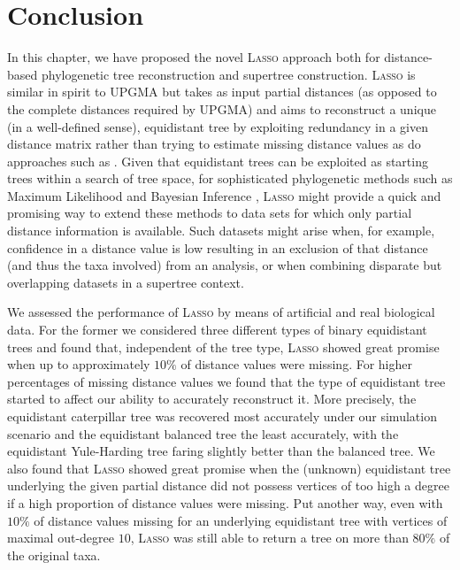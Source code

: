 \section{Conclusion}
\label{sec:conclusion}

In this chapter, we have proposed the novel \textsc{Lasso} approach both for
distance-based phylogenetic tree reconstruction and supertree construction.
\textsc{Lasso} is similar in spirit to \textsc{UPGMA} but takes as input
partial distances (as opposed to the complete distances required by
\textsc{UPGMA}) and aims to reconstruct a unique (in a well-defined sense),
equidistant tree by exploiting redundancy in a given distance matrix rather
than trying to estimate missing distance values as do approaches such as
\cite{criscuolo2008fastnj}. Given that equidistant trees can be exploited as
starting trees within a search of tree space, for sophisticated phylogenetic
methods such as Maximum Likelihood and Bayesian Inference
\cite{burbrink09molecular,bouckaert14beast}, \textsc{Lasso} might provide a
quick and promising way to extend these methods to data sets for which only
partial distance information is available. Such datasets might arise when, for
example, confidence in a distance value is low resulting in an exclusion of
that distance (and thus the taxa involved) from an analysis, or when combining
disparate but overlapping datasets in a supertree context.

We assessed the performance of \textsc{Lasso} by means of artificial and real
biological data.  For the former we considered three different types of binary
equidistant trees and found that, independent of the tree type, \textsc{Lasso}
showed great promise when up to approximately $10\%$ of distance values were
missing.  For higher percentages of missing distance values we found that the
type of equidistant tree started to affect our ability to accurately
reconstruct it. More precisely, the equidistant caterpillar tree was recovered
most accurately under our simulation scenario and the equidistant balanced
tree the least accurately, with the equidistant Yule-Harding tree faring
slightly better than the balanced tree.  We also found that \textsc{Lasso}
showed great promise when the (unknown) equidistant tree underlying the given
partial distance did not possess vertices of too high a degree if a high
proportion of distance values were missing.  Put another way, even with $10\%$
of distance values missing for an underlying equidistant tree with vertices of
maximal out-degree $10$, \textsc{Lasso} was still able to return a tree on
more than $80\%$ of the original taxa.


